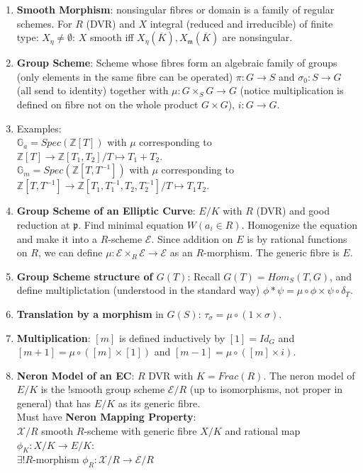 \documentclass{article}
\newcommand{\Z}{\mathbb{Z}}
\newcommand{\EE}{\mathcal{E}}
\newcommand{\pp}{\mathfrak{p}}
\newcommand{\mm}{\mathfrak{m}}
\newcommand{\ra}{\rightarrow}
\newcommand{\ACK}{\overline{K}}
\begin{document}
\begin{multicols}{2}
\begin{enumerate}
\item \textbf{Smooth Morphism}: nonsingular fibres or domain is a family of regular schemes. For $R$ (DVR) and $X$ integral (reduced and irreducible) of finite type: $X_\eta \neq \emptyset$: $X$ smooth iff $X_\eta(\ACK),X_\mm(\ACK)$ are nonsingular. 

\item \textbf{Group Scheme}: Scheme whose fibres form an algebraic family of groups (only elements in the same fibre can be operated) $\pi: G \ra S$ and $\sigma_0: S \ra G$ (all send to identity) together with $\mu: G \times_S G \ra G$ (notice multiplication is defined on fibre not on the whole product $G \times G$), $i: G \ra G$. 

\item Examples:\\
$\mathbb{G}_a = Spec(\Z[T])$ with $\mu$ corresponding to $\Z[T] \ra \Z[T_1,T_2]/ T \mapsto T_1 + T_2$.\\
$\mathbb{G}_m = Spec(\Z[T,T^{-1}])$ with $\mu$ corresponding to $\Z[T,T^{-1}] \ra \Z[T_1,T_1^{-1},T_2, T_2^{-1}]/ T \mapsto T_1T_2$.

\item \textbf{Group Scheme of an Elliptic Curve}: $E/K$ with $R$ (DVR) and good reduction at $\pp$. Find minimal equation $W(a_i \in R)$. Homogenize the equation and make it into a $R$-scheme $\EE$. Since addition on $E$ is by rational functions on $R$, we can define $\mu: \EE \times_R \EE \ra \EE$ as an $R$-morphism. The generic fibre is $E$.

\item \textbf{Group Scheme structure of $G(T)$}: Recall $G(T) = Hom_S(T,G)$, and define multiplictation (understood in the standard way) $\phi*\psi = \mu \circ \phi \times \psi \circ \delta_T$.  

\item \textbf{Translation by a morphism} in $G(S)$: $\tau_\sigma = \mu \circ (1 \times \sigma)$.\\

\item \textbf{Multiplication}: $[m]$ is defined inductively by $[1] = Id_G$ and $[m+1] = \mu \circ ([m] \times [1])$ and $[m-1] = \mu \circ ([m] \times i)$.  
 
\item \textbf{Neron Model of an EC}: $R$ DVR with $K = Frac(R)$. The neron model of $E/K$ is the !smooth group scheme $\EE/R$ (up to isomorphisms, not proper in general) that has $E/K$ as its generic fibre.\\
Must have \textbf{Neron Mapping Property}: \\
$\mathcal{X}/R$ smooth $R$-scheme with generic fibre $X/K$ and rational map $\phi_K: X/K \ra E/K$: \\
$\exists! R$-morphism $\phi_R: \mathcal{X}/R \ra \EE/R$


\end{enumerate}
\end{multicols}
\end{document}
